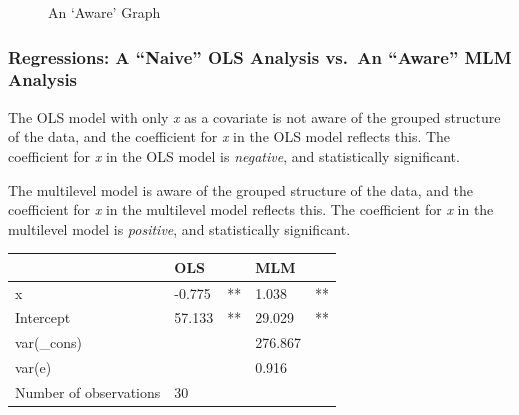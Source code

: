 \documentclass[
  letterpaper,
  DIV=11,
  numbers=noendperiod]{scrreprt}
\begin{document}
\begin{figure}


\caption{\label{fig-aware}An `Aware' Graph}

\end{figure}%

\subsubsection{Regressions: A ``Naive'' OLS Analysis vs.~An ``Aware''
MLM
Analysis}\label{regressions-a-naive-ols-analysis-vs.-an-aware-mlm-analysis}

The OLS model with only \emph{x} as a covariate is not aware of the
grouped structure of the data, and the coefficient for \emph{x} in the
OLS model reflects this. The coefficient for \emph{x} in the OLS model
is \emph{negative}, and statistically significant.

The multilevel model is aware of the grouped structure of the data, and
the coefficient for \emph{x} in the multilevel model reflects this. The
coefficient for \emph{x} in the multilevel model is \emph{positive}, and
statistically significant.

\begin{longtable}[]{@{}lllll@{}}
\toprule\noalign{}
& OLS & & MLM & \\
\midrule\noalign{}
\endhead
\bottomrule\noalign{}
\endlastfoot
x & -0.775 & ** & 1.038 & ** \\
Intercept & 57.133 & ** & 29.029 & ** \\
var(\_cons) & & & 276.867 & \\
var(e) & & & 0.916 & \\
Number of observations & 30 & & & \\
\end{longtable}
\end{document}
